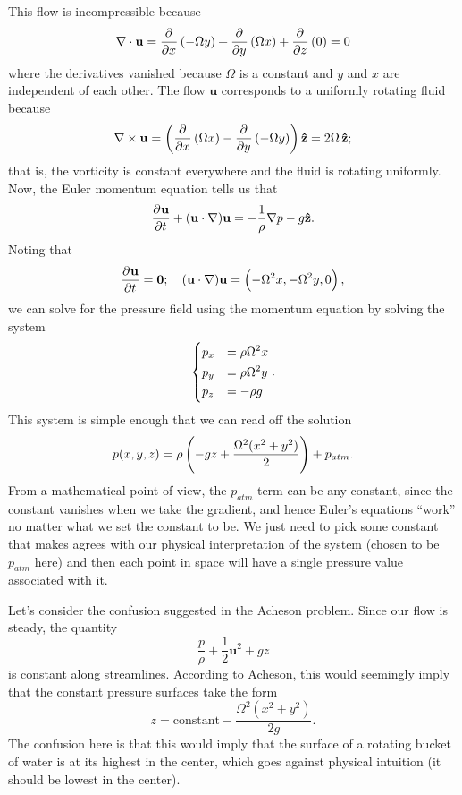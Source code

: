 \documentclass{article}
\def\*#1{\mathbf{#1}}
\newcommand{\zhat}{\mathbf{\hat{z}}}
\begin{document}
This flow is incompressible because
%
\begin{equation*}
    \nabla \cdot \*u
        = \dpd{}{x} \del{-\Omega y} + \dpd{}{y} \del{\Omega x} + \dpd{}{z} (0)
        = 0
\end{equation*}
%
where the derivatives vanished because $\Omega$ is a constant and $y$
and $x$ are independent of each other. The flow $\*u$ corresponds to a
uniformly rotating fluid because
%
\begin{equation*}
    \nabla \times \*u
        = \del{
            \dpd{}{x} \del{\Omega x} - \dpd{}{y} \del{- \Omega y}
        } \zhat
        = 2 \Omega \, \zhat
        ;
\end{equation*}
%
that is, the vorticity is constant everywhere and the fluid is rotating
uniformly. Now, the Euler momentum equation tells us that
%
\begin{equation*}
    \dpd{\*u}{t} + (\*u \cdot \nabla) \*u = - \frac{1}{\rho} \nabla p - g \zhat
    .
\end{equation*}
%
Noting that
%
\begin{equation*}
    \dpd{\*u}{t} = \*0; \quad
    (\*u \cdot \nabla) \*u = \del{- \Omega^2 x, - \Omega^2 y, 0}
    ,
\end{equation*}
%
we can solve for the pressure field using the momentum equation by
solving the system
%
\begin{equation*}
    \begin{dcases}
        p_x &= \rho \Omega^2 x \\
        p_y &= \rho \Omega^2 y \\
        p_z &= - \rho g
    \end{dcases}
    .
\end{equation*}
%
This system is simple enough that we can read off the solution
%
\begin{equation*}
    p(x, y, z) = \rho \del{- g z + \frac{\Omega^2 (x^2 + y^2)}{2}} + p_{atm}
    .
\end{equation*}
%
From a mathematical point of view, the $p_{atm}$ term can be any
constant, since the constant vanishes when we take the gradient, and
hence Euler's equations ``work'' no matter what we set the constant to
be. We just need to pick some constant that makes agrees with our
physical interpretation of the system (chosen to be $p_{atm}$ here) and
then each point in space will have a single pressure value associated
with it.

Let's consider the confusion suggested in the Acheson problem. Since our
flow is steady, the quantity
%
\begin{equation*}
    \frac{p}{\rho} + \frac{1}{2} \*u^2 + g z
\end{equation*}
%
is constant along streamlines. According to Acheson, this would
seemingly imply that the constant pressure surfaces take the form
%
\begin{equation*}
    z = \text{constant} - \frac{\Omega^2 (x^2 + y^2)}{2 g}
    .
\end{equation*}
%
The confusion here is that this would imply that the surface of a
rotating bucket of water is at its highest in the center, which goes
against physical intuition (it should be lowest in the center).
\end{document}
